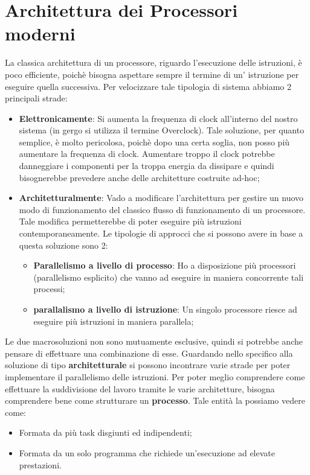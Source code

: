 \newpage
\section{Architettura dei Processori moderni}
La classica architettura di un processore, riguardo l'esecuzione delle istruzioni, è poco efficiente, poichè bisogna aspettare sempre il termine di un' istruzione per eseguire quella successiva.
Per velocizzare tale tipologia di sistema abbiamo 2 principali strade:
\begin{itemize}
    \item \textbf{Elettronicamente}: Si aumenta la frequenza di clock all'interno del nostro sistema (in gergo si utilizza il termine Overclock). Tale soluzione, per quanto semplice, è molto pericolosa, poichè dopo una certa soglia, non posso più aumentare la frequenza di clock. Aumentare troppo il clock potrebbe danneggiare i componenti per la troppa energia da dissipare e quindi bisognerebbe prevedere anche delle architetture costruite ad-hoc;
    
    \item \textbf{Architetturalmente}: Vado a modificare l'architettura per gestire un nuovo modo di funzionamento del classico flusso di funzionamento di un processore. Tale modifica permetterebbe di poter eseguire più istruzioni contemporaneamente. Le tipologie di approcci che si possono avere in base a questa soluzione sono 2:
    \begin{itemize}
        \item \textbf{Parallelismo a livello di processo}: Ho a disposizione più processori (parallelismo esplicito) che vanno ad eseguire in maniera concorrente tali processi;
        \item \textbf{parallalismo a livello di istruzione}: Un singolo processore riesce ad eseguire più istruzioni in maniera parallela;
    \end{itemize}
\end{itemize}

Le due macrosoluzioni non sono mutuamente esclusive, quindi si potrebbe anche pensare di effettuare una combinazione di esse.
Guardando nello specifico alla soluzione di tipo \textbf{architetturale} si possono incontrare varie strade per poter implementare il parallelismo delle istruzioni.
Per poter meglio comprendere come effettuare la suddivisione del lavoro tramite le varie architetture, bisogna comprendere bene come strutturare un \textbf{processo}. Tale entità la possiamo vedere come:
\begin{itemize}
    \item Formata da più task disgiunti ed indipendenti;
    \item Formata da un solo programma che richiede un'esecuzione ad elevate prestazioni.
\end{itemize}

